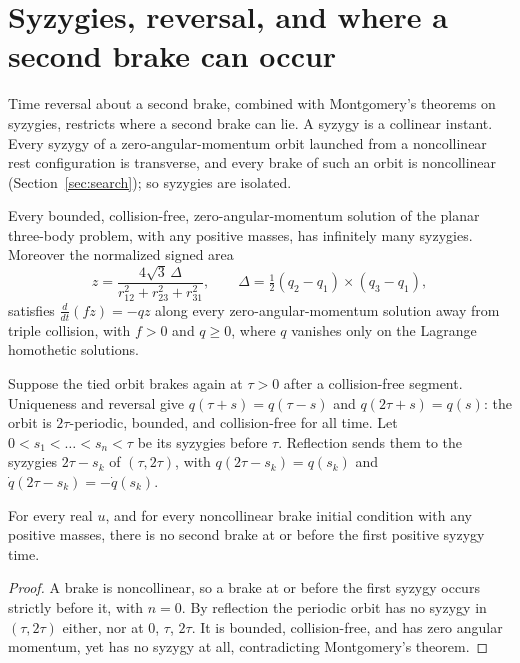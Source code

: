 \section{Syzygies, reversal, and where a second brake can occur}\label{sec:reversal}

Time reversal about a second brake, combined with Montgomery's theorems on
syzygies, restricts where a second brake can lie. A syzygy is a collinear
instant. Every syzygy of a zero-angular-momentum orbit launched from a
noncollinear rest configuration is transverse, and every brake of such an
orbit is noncollinear (Section~\ref{sec:search}); so syzygies are isolated.

\begin{theorem}
Every bounded, collision-free, zero-angular-momentum solution of the planar
three-body problem, with any positive masses, has infinitely many syzygies.
Moreover the normalized signed area
\[
 z=\frac{4\sqrt3\,\Delta}{r_{12}^2+r_{23}^2+r_{31}^2},
 \qquad \Delta=\tfrac12(q_2-q_1)\times(q_3-q_1),
\]
satisfies $\frac{d}{dt}(f\dot z)=-qz$ along every zero-angular-momentum
solution away from triple collision, with $f>0$ and $q\ge0$, where $q$
vanishes only on the Lagrange homothetic solutions.
\end{theorem}

Suppose the tied orbit brakes again at $\tau>0$ after a collision-free
segment. Uniqueness and reversal give $q(\tau+s)=q(\tau-s)$ and
$q(2\tau+s)=q(s)$: the orbit is $2\tau$-periodic, bounded, and
collision-free for all time. Let $0<s_1<\dots<s_n<\tau$ be its syzygies
before $\tau$. Reflection sends them to the syzygies $2\tau-s_k$ of
$(\tau,2\tau)$, with $q(2\tau-s_k)=q(s_k)$ and
$\dot q(2\tau-s_k)=-\dot q(s_k)$.

\begin{theorem}\label{thm:first-syzygy}
For every real $u$, and for every noncollinear brake initial condition with
any positive masses, there is no second brake at or before the first
positive syzygy time.
\end{theorem}
\begin{proof}
A brake is noncollinear, so a brake at or before the first syzygy occurs
strictly before it, with $n=0$. By reflection the periodic orbit has no
syzygy in $(\tau,2\tau)$ either, nor at $0$, $\tau$, $2\tau$. It is bounded,
collision-free, and has zero angular momentum, yet has no syzygy at all,
contradicting Montgomery's theorem.
\end{proof}


